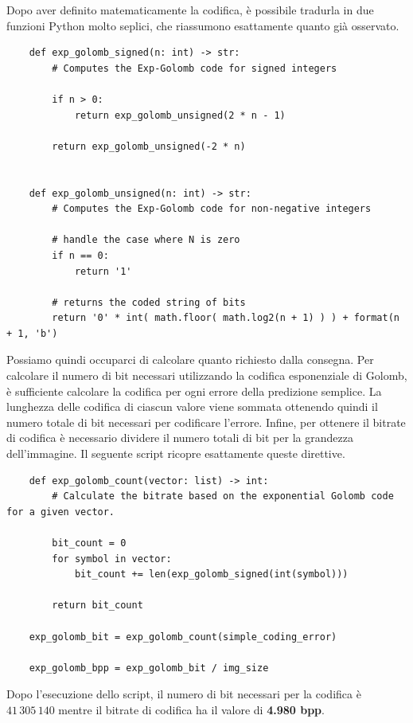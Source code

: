 \noindent Dopo aver definito matematicamente la codifica, è possibile tradurla in due funzioni Python molto seplici, che riassumono esattamente quanto già osservato.

\begin{lstlisting}
    def exp_golomb_signed(n: int) -> str:
        # Computes the Exp-Golomb code for signed integers
        
        if n > 0:
            return exp_golomb_unsigned(2 * n - 1)
            
        return exp_golomb_unsigned(-2 * n)
        

    def exp_golomb_unsigned(n: int) -> str:
        # Computes the Exp-Golomb code for non-negative integers

        # handle the case where N is zero
        if n == 0:
            return '1'
        
        # returns the coded string of bits
        return '0' * int( math.floor( math.log2(n + 1) ) ) + format(n + 1, 'b')
\end{lstlisting}

\noindent Possiamo quindi occuparci di calcolare quanto richiesto dalla consegna. Per calcolare il numero di bit necessari utilizzando la codifica esponenziale di Golomb, è sufficiente calcolare la codifica per ogni errore della predizione semplice. La lunghezza delle codifica di ciascun valore viene sommata ottenendo quindi il numero totale di bit necessari per codificare l'errore. Infine, per ottenere il bitrate di codifica è necessario dividere il numero totali di bit per la grandezza dell'immagine. Il seguente script ricopre esattamente queste direttive.

\begin{lstlisting}
    def exp_golomb_count(vector: list) -> int:
        # Calculate the bitrate based on the exponential Golomb code for a given vector.

        bit_count = 0
        for symbol in vector:
            bit_count += len(exp_golomb_signed(int(symbol)))

        return bit_count

    exp_golomb_bit = exp_golomb_count(simple_coding_error) 

    exp_golomb_bpp = exp_golomb_bit / img_size
\end{lstlisting}

\noindent Dopo l'esecuzione dello script, il numero di bit necessari per la codifica è $41\,305\,140$ mentre il bitrate di codifica ha il valore di \textbf{4.980 bpp}.


